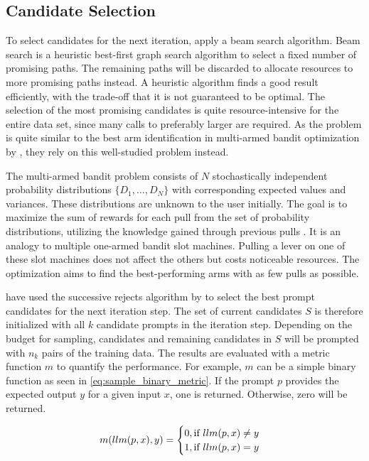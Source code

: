 \subsection{Candidate Selection}
To select candidates for the next iteration, \citeauthor{pryzant2023AutomaticPrompt} apply a beam search algorithm. Beam search is a heuristic best-first graph search algorithm to select a fixed number of promising paths. The remaining paths will be discarded to allocate resources to more promising paths instead. \cite{BeamSearch} A heuristic algorithm finds a good result efficiently, with the trade-off that it is not guaranteed to be optimal. The selection of the most promising candidates is quite resource-intensive for the entire data set, since many calls to preferably larger \LLMs are required. As the problem is quite similar to the best arm identification in multi-armed bandit optimization by , they rely on this well-studied problem instead.

The multi-armed bandit problem consists of $N$ stochastically independent probability distributions $\{ D_1, \dots, D_N\}$ with corresponding expected values and variances. These distributions are unknown to the user initially. The goal is to maximize the sum of rewards for each pull from the set of probability distributions, utilizing the knowledge gained through previous pulls \cite{kuleshov2014AlgorithmsMultiarmeda}. 
It is an analogy to multiple one-armed bandit slot machines. Pulling a lever on one of these slot machines does not affect the others but costs noticeable resources. The optimization aims to find the best-performing arms with as few pulls as possible. 

\citeauthor{pryzant2023AutomaticPrompt} have used the successive rejects algorithm by  to select the best prompt candidates for the next iteration step. The set of current candidates $S$ is therefore initialized with all $k$ candidate prompts in the iteration step. Depending on the budget for sampling, candidates and remaining candidates in $S$ will be prompted with $n_k$ pairs of the training data. The results are evaluated with a metric function $m$ to quantify the performance. For example, $m$ can be a simple binary function as seen in \autoref{eq:sample_binary_metric}. If the prompt $p$ provides the expected output $y$ for a given input $x$, one is returned. Otherwise, zero will be returned.

\begin{equation}
\label{eq:sample_binary_metric}
    m(llm(p, x), y) = 
    \begin{cases}
        0, \text{if $llm(p, x) \neq y$}\\
        1, \text{if $llm(p, x) = y$}
    \end{cases}
\end{equation}

